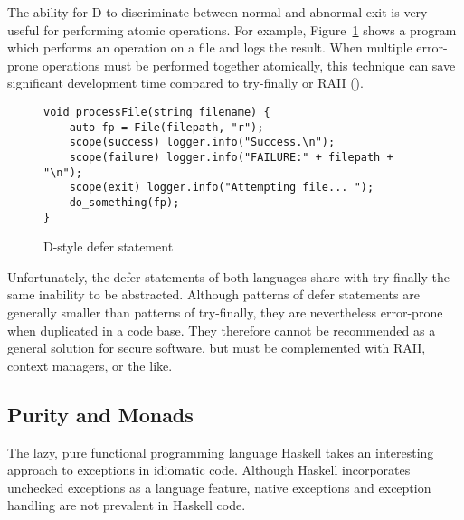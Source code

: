 \documentclass[11pt]{article}
\newcommand{\maybePage}{\newpage}
\begin{document}
The ability for D to discriminate between normal and abnormal exit is very useful for performing atomic operations.
For example, Figure~\ref{Dscope} shows a program which performs an operation on a file and logs the result.
When multiple error-prone operations must be performed together atomically, this technique can save significant development time compared to try-finally or RAII (\cite{DExceptionSafety}).

\begin{figure}[H]
\caption{D-style defer statement}
\label{Dscope}

\begin{verbatim}
void processFile(string filename) {
    auto fp = File(filepath, "r");
    scope(success) logger.info("Success.\n");
    scope(failure) logger.info("FAILURE:" + filepath + "\n");
    scope(exit) logger.info("Attempting file... ");
    do_something(fp);
}
\end{verbatim}

\end{figure}

Unfortunately, the defer statements of both languages share with try-finally the same inability to be abstracted.
Although patterns of defer statements are generally smaller than patterns of try-finally, they are nevertheless error-prone when duplicated in a code base.
They therefore cannot be recommended as a general solution for secure software, but must be complemented with RAII, context managers, or the like.




\maybePage
\subsection{Purity and Monads}
\label{subsec:exceptionMonads}
The lazy, pure functional programming language Haskell takes an interesting approach to exceptions in idiomatic code.
Although Haskell incorporates unchecked exceptions as a language feature, native exceptions and exception handling are not prevalent in Haskell code.
\end{document}
